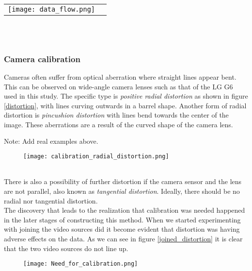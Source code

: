 \ \\ 
\noindent
\begin{tabular}{@{}cc}
\texttt{[image: data\_flow.png]} 
\end{tabular}
\label{data}
\ \\

\ \\

\subsubsection{Camera calibration}
Cameras often suffer from optical aberration where straight lines appear bent. This can be observed on wide-angle camera lenses such as that of the LG G6 used in this study.
The specific type is \textit{positive radial distortion} as shown in figure \ref{distortion}, with lines curving outwards in a barrel shape.
Another form of radial distortion is \textit{pincushion distortion} with lines bend towards the center of the image. These aberrations are a result 
of the curved shape of the camera lens.

Note: Add real examples above.
\ \\ 
\begin{figure}[h]
  \texttt{[image: calibration\_radial\_distortion.png]}
  \centering 
  \end{figure}
  \label{distortion}

\ \\

There is also a possibility of further distortion if the camera sensor and the lens are not parallel, also known as \textit{tangential distortion}.
Ideally, there should be no radial nor tangential distortion.
\ \\
The discovery that leads to the realization that calibration was needed happened in the later stages of constructing this method. When we
started experimenting with joining the video sources did it become evident that distortion was having adverse effects on the data. As we can see in figure 
\ref{joined_distortion} it is clear that the two video sources do not line up.

\begin{figure}[h]
  \texttt{[image: Need\_for\_calibration.png]}
  \centering 
  \end{figure}
  \label{joined_distortion}
\ \\

